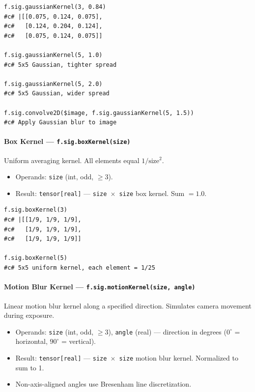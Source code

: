 \begin{verbatim}
f.sig.gaussianKernel(3, 0.84)
#c# |[[0.075, 0.124, 0.075],
#c#   [0.124, 0.204, 0.124],
#c#   [0.075, 0.124, 0.075]]

f.sig.gaussianKernel(5, 1.0)
#c# 5x5 Gaussian, tighter spread

f.sig.gaussianKernel(5, 2.0)
#c# 5x5 Gaussian, wider spread

f.sig.convolve2D($image, f.sig.gaussianKernel(5, 1.5))
#c# Apply Gaussian blur to image
\end{verbatim}

\paragraph{Box Kernel --- \texttt{f.sig.boxKernel(size)}}

Uniform averaging kernel. All elements equal $1/\text{size}^2$.

\begin{itemize}
\item Operands: \texttt{size} (int, odd, $\geq 3$).
\item Result: \texttt{tensor[real]} --- \texttt{size $\times$ size} box kernel. Sum $= 1.0$.
\end{itemize}

\begin{verbatim}
f.sig.boxKernel(3)
#c# |[[1/9, 1/9, 1/9],
#c#   [1/9, 1/9, 1/9],
#c#   [1/9, 1/9, 1/9]]

f.sig.boxKernel(5)
#c# 5x5 uniform kernel, each element = 1/25
\end{verbatim}

\paragraph{Motion Blur Kernel --- \texttt{f.sig.motionKernel(size, angle)}}

Linear motion blur kernel along a specified direction. Simulates camera movement during exposure.

\begin{itemize}
\item Operands: \texttt{size} (int, odd, $\geq 3$), \texttt{angle} (real) --- direction in degrees ($0^\circ$ = horizontal, $90^\circ$ = vertical).
\item Result: \texttt{tensor[real]} --- \texttt{size $\times$ size} motion blur kernel. Normalized to sum to 1.
\item Non-axis-aligned angles use Bresenham line discretization.
\end{itemize}

